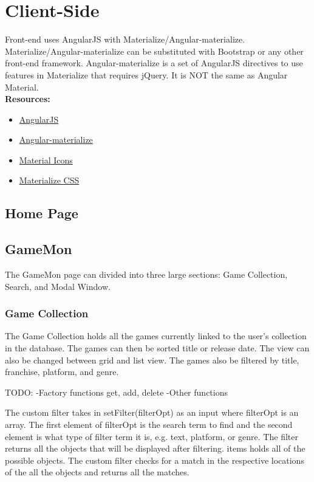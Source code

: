 \documentclass{article}
\begin{document}
\section{Client-Side}
Front-end uses AngularJS with Materialize/Angular-materialize. Materialize/Angular-materialize can be substituted with Bootstrap or any other front-end framework. Angular-materialize is a set of AngularJS directives to use features in Materialize that requires jQuery. It is NOT the same as Angular Material.
\\
\textbf{Resources:}
\begin{itemize}
  \item \href {https://docs.angularjs.org/api}{AngularJS}
  \item \href {https://krescruz.github.io/angular-materialize/}{Angular-materialize}
  \item \href {https://getmdl.io/started/}{Material Icons}
  \item \href {http://materializecss.com/}{Materialize CSS}
\end{itemize}
\subsection{Home Page}

\subsection{GameMon}
The GameMon page can divided into three large sections: Game Collection, Search, and Modal Window.
\subsubsection{Game Collection}
The Game Collection holds all the games currently linked to the user's collection in the database. The games can then be sorted title or release date. The view can also be changed between grid and list view. The games also be filtered by title, franchise, platform, and genre.

TODO:
-Factory functions get, add, delete
-Other functions

The custom filter takes in setFilter(filterOpt) as an input where filterOpt is an array. The first element of filterOpt is the search term to find and the second element is what type of filter term it is, e.g. text, platform, or genre. The filter returns all the objects that will be displayed after filtering. items holds all of the possible objects. The custom filter checks for a match in the respective locations of the all the objects and returns all the matches.
\end{document}
